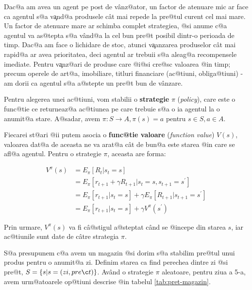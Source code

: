 Dac@a am avea un agent pe post de v\^ anz@ator, un factor de atenuare mic ar face ca agentul s@a v{\c a}nd@a produsele c\^ at mai repede la pre@tul curent cel mai mare. Un factor de atenuare mare ar schimba complet strategiea, @si anume c@a agentul va as@tepta s@a v\^ and@a la cel bun pre@t posibil dintr-o perioada de timp. Dac@a am face o lichidare de stoc, atunci v{\c a}anzarea produselor c\^ at mai rapid@a ar avea prioritatea, deci agentul ar trebuii s@a aleag@a recompensele imediate. Pentru v{\c a}nz@ari de produse care @i@si cre@sc valoarea @in timp; precum operele de art@a, imobiliare, titluri financiare (ac@tiuni, obliga@tiuni) - am dorii ca agentul s@a a@stepte un pre@t bun de v\^ anzare.

Pentru alegerea unei ac@tiuni, vom stabilii o \textbf{strategie} $\pi$ (\textsl{policy}), care este o func@tie ce returneaz@a ac@tiunea pe care trebuie s@a o ia agentul la o anumit@a stare. A@sadar, avem $\pi: S \rightarrow A, \pi(s) = a $ pentru $ s \in S, a \in A$.

Fiecarei st@ari @ii putem asocia o \textbf{func@tie valoare} (\textsl{function value}) $V(s)$, valoarea dat@a de aceasta ne va arat@a c\^ at de bun@a este starea @in care se afl@a agentul. Pentru o strategie $\pi$, aceasta are forma:


\begin{align}
	V^{\pi}(s) & =   E_{\pi} \left[ R_t | s_t = s \right] \\
	& =  E_{\pi} \left[ r_{t+1} + \gamma R_{t+1} | s_t = s, s_{t+1} = s^{\prime} \right] \\
	& =   E_{\pi} \left[ r_{t+1}| s_t = s \right] + \gamma E_{\pi} \left[  R_{t+1} | s_{t+1} = s^{\prime} \right] \\
	& =  E_{\pi} \left[ r_{t+1}| s_t = s \right] + \gamma V^{\pi}(s^{\prime})
\end{align}

\noindent Prin urmare, $V^{\pi}(s)$ va fi c\^ a@stigul a@steptat c\^ and se @incepe din starea $s$, iar ac@tiunile sunt date de c\^atre strategia $\pi$.

S@a presupunem c@a avem un magazin @si dorim s@a stabilim pre@tul unui produs pentru o anumit@a zi. Definim starea ca find perechea dintre zi @si pre@t, $S = \left\lbrace  s | s = (zi, pre\c t) \right\rbrace$. Av\^ and o strategie $\pi$ aleatoare, pentru ziua a 5-a, avem urm@atoarele op@tiuni descrise @in tabelul \ref{tab:pret-magazin}.

